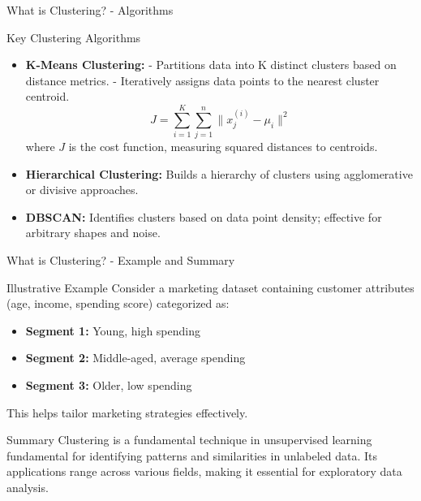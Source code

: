 \documentclass[aspectratio=169]{beamer}
\begin{document}
\begin{frame}[fragile]{What is Clustering? - Algorithms}
    \begin{block}{Key Clustering Algorithms}
        \begin{itemize}
            \item \textbf{K-Means Clustering:} 
                - Partitions data into K distinct clusters based on distance metrics.
                - Iteratively assigns data points to the nearest cluster centroid.
                \begin{equation}
                J = \sum_{i=1}^{K} \sum_{j=1}^{n} \| x_j^{(i)} - \mu_i \|^2
                \end{equation}
                where \( J \) is the cost function, measuring squared distances to centroids.
                
            \item \textbf{Hierarchical Clustering:} Builds a hierarchy of clusters using agglomerative or divisive approaches.
                
            \item \textbf{DBSCAN:} Identifies clusters based on data point density; effective for arbitrary shapes and noise.
        \end{itemize}
    \end{block}
\end{frame}

\begin{frame}[fragile]{What is Clustering? - Example and Summary}
    \begin{block}{Illustrative Example}
        Consider a marketing dataset containing customer attributes (age, income, spending score) categorized as:
        \begin{itemize}
            \item \textbf{Segment 1:} Young, high spending
            \item \textbf{Segment 2:} Middle-aged, average spending
            \item \textbf{Segment 3:} Older, low spending
        \end{itemize}
        This helps tailor marketing strategies effectively.
    \end{block}

    \begin{block}{Summary}
        Clustering is a fundamental technique in unsupervised learning fundamental for identifying patterns and similarities in unlabeled data. Its applications range across various fields, making it essential for exploratory data analysis.
    \end{block}
\end{frame}
\end{document}
